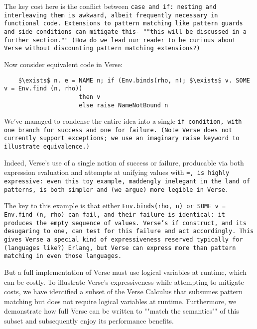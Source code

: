 \documentclass[]{article}
\begin{document}
\bigskip 

The key cost here is the conflict between \tt{case} and \tt{if}: nesting and 
interleaving them is awkward, albeit frequently necessary in functional code. 
Extensions to pattern matching like pattern guards and side conditions can 
mitigate this- ""this will be discussed in a further section."" (How do we lead 
our reader to be curious about Verse without discounting pattern matching 
extensions?)

\bigskip

Now consider equivalent code in Verse: 
\verselst

\begin{lstlisting}
    $\exists$ n. e = NAME n; if (Env.binds(rho, n); $\exists$ v. SOME v = Env.find (n, rho)) 
                     then v
                     else raise NameNotBound n
\end{lstlisting}

\bigskip

We've managed to condense the entire idea into a single \tt{if} condition, 
with one branch for success and one for failure. (Note Verse does not currently
support exceptions; we use an imaginary \tt{raise} keyword to illustrate
equivalence.)

Indeed, Verse's use of a single notion of success or failure, producable via 
both expression evaluation and attempts at unifying values with \tt{=}, is 
highly expressive: even this toy example, maddengly inelegant in the land of 
patterns, is both simpler and (we argue) more legible in Verse. 

The key to this example is that either \tt{Env.binds(rho, n)}  or \tt{SOME v =
Env.find (n, rho)} can fail, and their failure is identical: it produces the
empty sequence of values. Verse's \tt{if} construct, and its desugaring to
\tt{one}, can test for this failure and act accordingly. This gives Verse a 
special kind of expressiveness reserved typically for (languages like?) Erlang, 
but Verse can express more than pattern matching in even those languages. 




But a full implementation of Verse must use logical variables at runtime, which
can be costly. To illustrate Verse's expressiveness while attempting to mitigate
costs, we have identified a subset of the Verse Calculus that subsumes pattern
matching but does not require logical variables at runtime. Furthermore, we
demonstrate how full Verse can be written to ""match the semantics"" of this
subset and subsequently enjoy its performance benefits. 
\end{document}
